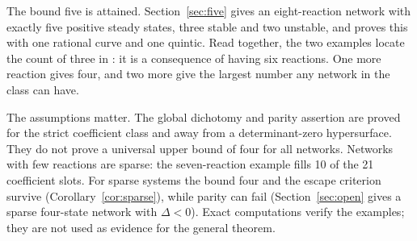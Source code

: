\documentclass[11pt]{article}
\theoremstyle{remark}\newtheorem{remark}[theorem]{Remark}
\begin{document}
The bound five is attained. Section~\ref{sec:five} gives an eight-reaction network
with exactly five positive steady states, three stable and two unstable, and
proves this with one rational curve and one quintic. Read together, the two
examples locate the count of three in \cite{TZ}: it is a consequence of having
six reactions. One more reaction gives four, and two more give the largest
number any network in the class can have.

The assumptions matter. The global dichotomy and parity assertion are proved
for the strict coefficient class and away from a determinant-zero hypersurface.
They do not prove a universal upper bound of four for all networks. Networks
with few reactions are sparse: the seven-reaction example fills 10 of the 21
coefficient slots. For sparse systems the bound four and the escape criterion
survive (Corollary~\ref{cor:sparse}), while parity can fail
(Section~\ref{sec:open} gives a sparse four-state network with $\Delta<0$). Exact computations verify the examples; they
are not used as evidence for the general theorem.
\end{document}
